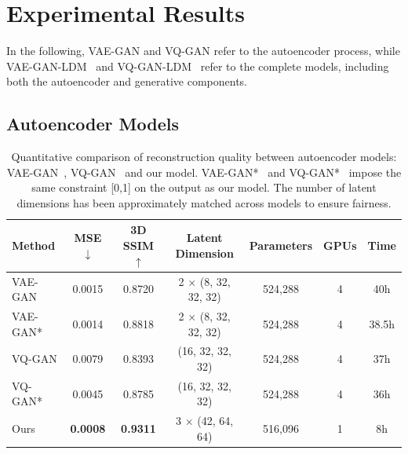 \documentclass[letterpaper]{article} %
\begin{document}
\section{Experimental Results}
In the following, VAE-GAN and VQ-GAN refer to the autoencoder process, while VAE-GAN-LDM~\cite{Pinaya2022BrainIG} and VQ-GAN-LDM~\cite{Khader2022MedicalDD} refer to the complete models, including both the autoencoder and generative components.

\subsection{Autoencoder Models}
\begin{table}[h]
\centering
\begin{tabular}{lcccccc}
\toprule
Method & MSE $\downarrow$ & 3D SSIM $\uparrow$ & Latent Dimension & Parameters & GPUs & Time \\
\midrule
VAE-GAN & 0.0015 & 0.8720 & 2 $\times$ (8, 32, 32, 32) & 524,288 & 4 & 40h \\
VAE-GAN* & 0.0014 & 0.8818 & 2 $\times$ (8, 32, 32, 32) & 524,288 & 4 & 38.5h \\
VQ-GAN & 0.0079 & 0.8393 & (16, 32, 32, 32) & 524,288 & 4 & 37h \\
VQ-GAN* & 0.0045 & 0.8785 & (16, 32, 32, 32) & 524,288 & 4 & 36h \\
\midrule
Ours & \textbf{0.0008} & \textbf{0.9311} & 3 $\times$ (42, 64, 64) & 516,096 & 1 & 8h \\
\bottomrule
\end{tabular}
\caption{Quantitative comparison of reconstruction quality between autoencoder models: VAE-GAN~\cite{Pinaya2022BrainIG}, VQ-GAN~\cite{Khader2022MedicalDD} and our model. VAE-GAN*~\cite{Pinaya2022BrainIG} and VQ-GAN*~\cite{Khader2022MedicalDD} impose the same constraint [0,1] on the output as our model. The number of latent dimensions has been approximately matched across models to ensure fairness. }
\label{tab1}
\end{table}
\end{document}
